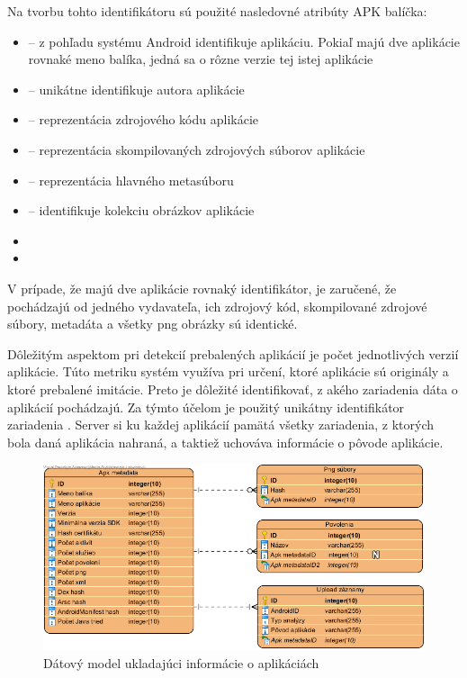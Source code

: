  
\noindent Na tvorbu tohto identifikátoru sú použité nasledovné atribúty APK balíčka: 
\begin{itemize}
	\item {} -- z pohľadu systému Android identifikuje aplikáciu. Pokiaľ majú dve aplikácie rovnaké meno balíka, jedná sa o rôzne verzie tej istej aplikácie
	\item {} -- unikátne identifikuje autora aplikácie
	\item {} -- reprezentácia zdrojového kódu aplikácie
	\item {} -- reprezentácia skompilovaných zdrojových súborov aplikácie
	\item {} -- reprezentácia hlavného metasúboru
	\item {} -- identifikuje kolekciu obrázkov aplikácie
	\item {}
	\item {}
\end{itemize}
V prípade, že majú dve aplikácie rovnaký identifikátor, je zaručené, že pochádzajú od jedného vydavateľa, ich zdrojový kód, skompilované zdrojové súbory, metadáta a všetky png obrázky sú identické. 

Dôležitým aspektom pri detekcií prebalených aplikácií je počet jednotlivých verzií aplikácie. Túto metriku systém využíva pri určení, ktoré aplikácie sú originály a ktoré prebalené imitácie. Preto je dôležité identifikovať, z akého zariadenia dáta o aplikácií pochádzajú. Za týmto účelom je použitý unikátny identifikátor zariadenia . Server si ku každej aplikácií pamätá všetky zariadenia, z ktorých bola daná aplikácia nahraná, a taktiež uchováva informácie o pôvode aplikácie.

\begin{figure}[htb]
  \begin{center}
    \includegraphics[width=130mm]{images/detection-db-erd.png}
  \end{center}
  \caption{Dátový model ukladajúci informácie o aplikáciách}
  \label{fig:detectionDbErd}
\end{figure}

